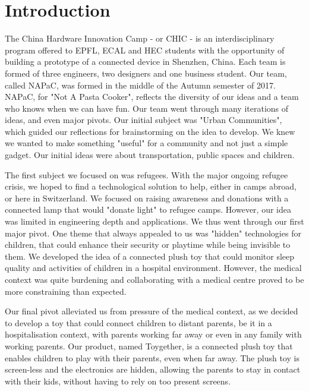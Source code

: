 \newpage
\section{Introduction}
\label{sec:introduction}


The China Hardware Innovation Camp - or CHIC - is an interdisciplinary program offered to EPFL, ECAL and HEC students with the opportunity of building a prototype of a connected device in Shenzhen, China. Each team is formed of three engineers, two designers and one business student. Our team, called NAPaC, was formed in the middle of the Autumn semester of 2017. NAPaC, for "Not A Pasta Cooker", reflects the diversity of our ideas and a team who knows when we can have fun. Our team went through many iterations of ideas, and even major pivots. Our initial subject was "Urban Communities", which guided our reflections for brainstorming on the idea to develop. We knew we wanted to make something "useful" for a community and not just a simple gadget. Our initial ideas were about transportation, public spaces and children.

\medskip
The first subject we focused on was refugees. With the major ongoing refugee crisis, we hoped to find a technological solution to help, either in camps abroad, or here in Switzerland. We focused on raising awareness and donations with a connected lamp that would "donate light" to refugee camps. However, our idea was limited in engineering depth and applications. We thus went through our first major pivot. One theme that always appealed to us was "hidden" technologies for children, that could enhance their security or playtime while being invisible to them. We developed the idea of a connected plush toy that could monitor sleep quality and activities of children in a hospital environment. However, the medical context was quite burdening and collaborating with a medical centre proved to be more constraining than expected.

\medskip
Our final pivot alleviated us from pressure of the medical context, as we decided to develop a toy that could connect children to distant parents, be it in a hospitalisation context, with parents working far away or even in any family with working parents. Our product, named Toygether, is a connected plush toy that enables children to play with their parents, even when far away. The plush toy is screen-less and the electronics are hidden, allowing the parents to stay in contact with their kids, without having to rely on too present screens. \newline

